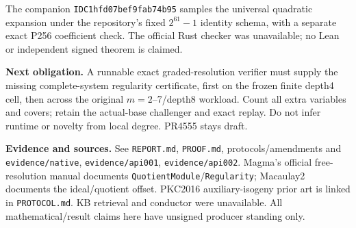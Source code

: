 \documentclass[10pt]{article}
\begin{document}
The companion \texttt{IDC1hfd07bef9fab74b95} samples the universal quadratic
expansion under the repository's fixed $2^{61}-1$ identity schema, with a
separate exact P256 coefficient check. The official Rust checker was
unavailable; no Lean or independent signed theorem is claimed.

\textbf{Next obligation.}
A runnable exact graded-resolution verifier must supply the missing
complete-system regularity certificate, first on the frozen finite depth4
cell, then across the original $m=2$--7/depth8 workload. Count all extra
variables and covers; retain the actual-base challenger and exact replay.
Do not infer runtime or novelty from local degree. PR4555 stays draft.

\textbf{Evidence and sources.}
See \texttt{REPORT.md}, \texttt{PROOF.md}, protocols/amendments and
\texttt{evidence/native}, \texttt{evidence/api001}, \texttt{evidence/api002}.
Magma's official free-resolution manual documents
\texttt{QuotientModule}/\texttt{Regularity}; Macaulay2 documents the
ideal/quotient offset. PKC2016 auxiliary-isogeny prior art is linked in
\texttt{PROTOCOL.md}. KB retrieval and conductor were unavailable. All
mathematical/result claims here have unsigned producer standing only.
\end{document}
